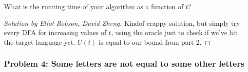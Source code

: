 \documentclass{article}
\newenvironment{solution}[1]{\begin{proof}[Solution by #1]}{\end{proof}}
\begin{document}
\begin{enumerate}
	What is the running time of your algorithm as a function of \(t\)? %
    
    \begin{solution}{Eliot Robson, David Zheng}
        Kindof crappy solution, but simply try every DFA for increasing values of \(t\), using the oracle just to check if we've hit the target language yet. \(U(t)\) is equal to our bound from part 2.
    \end{solution}
\end{enumerate}

\subsubsection{Problem 4: Some letters are not equal to some other letters}
\end{document}
